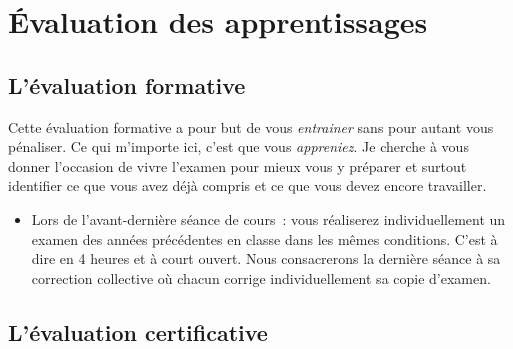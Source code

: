 \clearpage
\section{Évaluation des apprentissages}

\subsection{L’évaluation formative}

\label{eval_formative}
Cette évaluation formative a pour but de vous \emph{entrainer} sans pour autant vous pénaliser. Ce qui m'importe ici, c'est que vous \emph{appreniez}. Je cherche à vous donner l'occasion de vivre l'examen pour mieux vous y préparer et surtout identifier ce que vous avez déjà compris et ce que vous devez encore travailler.
\begin{itemize}
    \item Lors de l'avant-dernière séance de cours~: vous réaliserez individuellement un examen des années précédentes en classe dans les mêmes conditions. C'est à dire en 4 heures et à court ouvert. Nous consacrerons la dernière séance à sa correction collective où chacun corrige individuellement sa copie d'examen.
\end{itemize}

\subsection{L’évaluation certificative}

